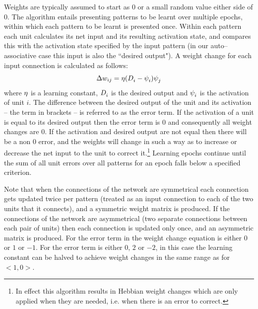 Weights are typically assumed to start as $0$ or a small random value either side of $0$. The algorithm entails presenting patterns to be learnt over multiple epochs, within which each pattern to be learnt is presented once.  Within each pattern each unit calculates its net input and its resulting activation state, and compares this with the activation state specified by the input pattern (in our auto--associative case this input is also the ``desired output").  A weight change for each input connection is calculated as follows:
\begin{equation}
	\Delta w_{ij} = \eta(D_{i}^{} - \psi_{i}^{})\psi_{j}^{}
\end{equation}
where $\eta$ is a learning constant, $D_{i}^{}$ is the desired output and $\psi_{i}^{}$ is the activation of unit $i$.  The difference between the desired output of the unit and its activation -- the term in brackets -- is referred to as the error term.  If the activation of a unit is equal to its desired output then the error term is $0$ and consequently all weight changes are $0$.  If the activation and desired output are not equal then there will be a non $0$ error, and the weights will change in such a way as to increase or decrease the net input to the unit to correct it.\footnote{In effect this algorithm results in Hebbian weight changes which are only applied when they are needed, i.e. when there is an error to correct.} Learning epochs continue until the sum of all unit errors over all patterns for an epoch falls below a specified criterion.

Note that when the connections of the network are symmetrical each connection gets updated twice per pattern (treated as an input connection to each of the two units that it connects), and a symmetric weight matrix is produced.  If the connections of the network are asymmetrical (two separate connections between each pair of units) then each connection is updated only once, and an asymmetric matrix is produced.   For   the error term in the weight change equation is either $0$ or $1$ or $-1$.  For   the error term is either $0$, $2$ or $-2$, in this case the learning constant can be halved to achieve weight changes in the same range as for $<1, 0>$.

